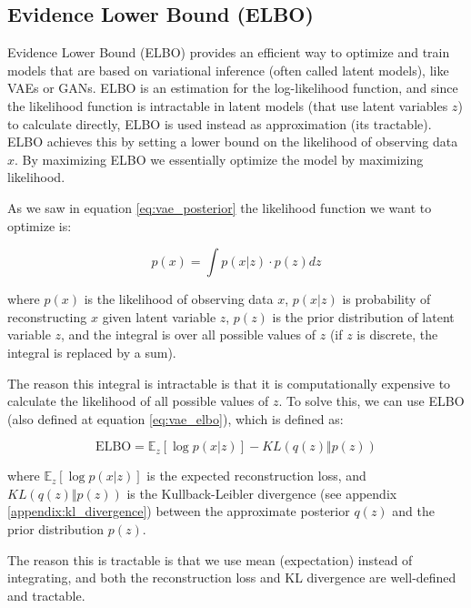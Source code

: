 \subsection{Evidence Lower Bound (ELBO)}
\label{appendix:elbo}

Evidence Lower Bound (ELBO) provides an efficient way to optimize and train models that are based on variational inference (often called latent models), like VAEs or GANs. ELBO is an estimation for the log-likelihood function, and since the likelihood function is intractable in latent models (that use latent variables $z$) to calculate directly, ELBO is used instead as approximation (its tractable). ELBO achieves this by setting a lower bound on the likelihood of observing data $x$. By maximizing ELBO we essentially optimize the model by maximizing likelihood.

As we saw in equation \ref{eq:vae_posterior} the likelihood function we want to optimize is:

\begin{equation}
    p(x) = \int p(x | z) \cdot p(z) dz
\end{equation}

where $p(x)$ is the likelihood of observing data $x$, $p(x | z)$ is probability of reconstructing $x$ given latent variable $z$,  $p(z)$ is the prior distribution of latent variable $z$, and the integral is over all possible values of $z$ (if $z$ is discrete, the integral is replaced by a sum).

The reason this integral is intractable is that it is computationally expensive to calculate the likelihood of all possible values of $z$. To solve this, we can use ELBO (also defined at equation \ref{eq:vae_elbo}), which is defined as:

\begin{equation}
    \text{ELBO} = \mathbb{E}_z[\log p(x | z)] - KL(q(z) \Vert p(z))
    \label{eq:elbo}
\end{equation}

where $\mathbb{E}_z[\log p(x | z)]$ is the expected reconstruction loss, and $KL(q(z) \Vert p(z))$ is the Kullback-Leibler divergence (see appendix \ref{appendix:kl_divergence}) between the approximate posterior $q(z)$ and the prior distribution $p(z)$.

The reason this is tractable is that we use mean (expectation) instead of integrating, and both the reconstruction loss and KL divergence are well-defined and tractable. 
